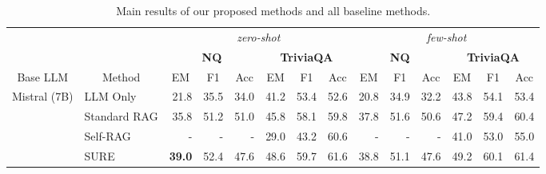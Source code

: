 \begin{table}[htbp]
  \centering
  \large
  \setlength\abovecaptionskip{-0.3pt}
  \setlength\belowcaptionskip{-0.3pt}
  \caption{Statistics of the test datasets.}
  \label{tab:dataset}%
\end{table}



\begin{table*}[t]
  \setlength\abovecaptionskip{-0.3pt}
  \setlength\belowcaptionskip{-0.3pt}
  \setlength{\tabcolsep}{1.9mm}
  \centering
  \caption{Main results of our proposed methods and all baseline methods. }
    \begin{tabular}{llrrrrrrrrrrrr}
    \toprule
          &       & \multicolumn{6}{c}{\textit{zero-shot}}        & \multicolumn{6}{c}{\textit{few-shot}} \\
          &       & \multicolumn{3}{c}{\textbf{NQ}} & \multicolumn{3}{c}{\textbf{TriviaQA}} & \multicolumn{3}{c}{\textbf{NQ}} & \multicolumn{3}{c}{\textbf{TriviaQA}} \\
    \multicolumn{1}{c}{Base LLM} & \multicolumn{1}{c}{Method} & \multicolumn{1}{c}{EM} & \multicolumn{1}{c}{F1} & \multicolumn{1}{c}{Acc} & \multicolumn{1}{c}{EM} & \multicolumn{1}{c}{F1} & \multicolumn{1}{c}{Acc} & \multicolumn{1}{c}{EM} & \multicolumn{1}{c}{F1} & \multicolumn{1}{c}{Acc} & \multicolumn{1}{c}{EM} & \multicolumn{1}{c}{F1} & \multicolumn{1}{c}{Acc} \\
    \midrule
    \multirow{6}[2]{*}{Mistral (7B)} & LLM Only & 21.8  & 35.5  & 34.0  & 41.2  & 53.4  & 52.6  & 20.8  & 34.9  & 32.2  & 43.8  & 54.1  & 53.4 \\
          & Standard RAG  & 35.8  & 51.2  & 51.0  & 45.8  & 58.1  & 59.8  & 37.8  & 51.6  & 50.6  & 47.2  & 59.4  & 60.4 \\
          & Self-RAG & -     & -     & -     & 29.0  & 43.2  & 60.6  & -     & -     & -     & 41.0  & 53.0  & 55.0 \\
          & SURE  & \textbf{39.0} & 52.4  & 47.6  & 48.6  & 59.7  & 61.6  & 38.8  & 51.1  & 47.6  & 49.2  & 60.1  & 61.4 \\

\end{tabular}
\end{table*}
